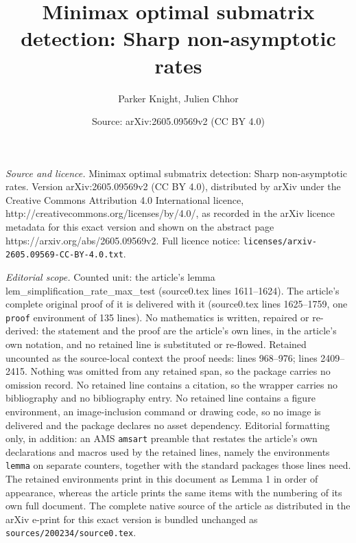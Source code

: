 \documentclass[10pt,a4paper]{amsart}
\title{Minimax optimal submatrix detection: Sharp non-asymptotic rates}
\author{Parker Knight, Julien Chhor}
\date{Source: arXiv:2605.09569v2 (CC BY 4.0)}
\begin{document}
\maketitle

\noindent\emph{Source and licence.} Minimax optimal submatrix detection: Sharp non-asymptotic rates. Version arXiv:2605.09569v2 (CC BY 4.0), distributed by arXiv under the Creative Commons Attribution 4.0 International licence, http://creativecommons.org/licenses/by/4.0/, as recorded in the arXiv licence metadata for this exact version and shown on the abstract page https://arxiv.org/abs/2605.09569v2. Full licence notice: \texttt{licenses/arxiv-2605.09569-CC-BY-4.0.txt}.\par\smallskip

\noindent\textit{Editorial scope.} Counted unit: the article's lemma lem\_simplification\_rate\_max\_test (source0.tex lines 1611--1624). The article's complete original proof of it is delivered with it (source0.tex lines 1625--1759, one \texttt{proof} environment of 135 lines). No mathematics is written, repaired or re-derived: the statement and the proof are the article's own lines, in the article's own notation, and no retained line is substituted or re-flowed.  Retained uncounted as the source-local context the proof needs: lines 968--976; lines 2409--2415.  Nothing was omitted from any retained span, so the package carries no omission record.  No retained line contains a citation, so the wrapper carries no bibliography and no bibliography entry.  No retained line contains a figure environment, an image-inclusion command or drawing code, so no image is delivered and the package declares no asset dependency.  Editorial formatting only, in addition: an AMS \texttt{amsart} preamble that restates the article's own declarations and macros used by the retained lines, namely the environments \texttt{lemma} on separate counters, together with the standard packages those lines need.  The retained environments print in this document as Lemma 1 in order of appearance, whereas the article prints the same items with the numbering of its own full document.  The complete native source of the article as distributed in the arXiv e-print for this exact version is bundled unchanged as \texttt{sources/200234/source0.tex}.
\end{document}
